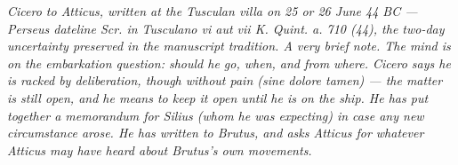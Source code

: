 
\textit{Cicero to Atticus, written at the Tusculan villa on 25
or 26 June 44 BC --- Perseus dateline \textit{Scr. in Tusculano
vi aut vii K. Quint. a. 710 (44)}, the two-day uncertainty
preserved in the manuscript tradition. A very brief note. The
mind is on the embarkation question: should he go, when, and
from where. Cicero says he is racked by deliberation, though
without pain (\textit{sine dolore tamen}) --- the matter is
still open, and he means to keep it open until he is on the
ship. He has put together a memorandum for Silius (whom he was
expecting) in case any new circumstance arose. He has written
to Brutus, and asks Atticus for whatever Atticus may have
heard about Brutus's own movements.}
